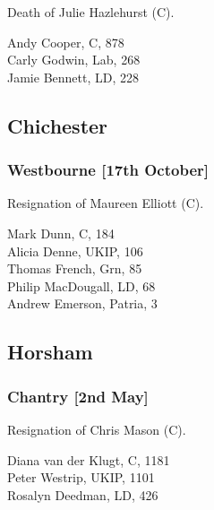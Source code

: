 \documentclass[a4paper,openany,10pt]{book}
\begin{document}

Death of Julie Hazlehurst (C).



Andy Cooper, C, 878\\
Carly Godwin, Lab, 268\\
Jamie Bennett, LD, 228\\


\subsection*{Chichester}

\subsubsection*{Westbourne \hspace*{\fill}\nolinebreak[1]%
\enspace\hspace*{\fill}
[17th October]}


Resignation of Maureen Elliott (C).



Mark Dunn, C, 184\\
Alicia Denne, UKIP, 106\\
Thomas French, Grn, 85\\
Philip MacDougall, LD, 68\\
Andrew Emerson, Patria, 3\\


\subsection*{Horsham}

\subsubsection*{Chantry \hspace*{\fill}\nolinebreak[1]%
\enspace\hspace*{\fill}
[2nd May]}


Resignation of Chris Mason (C).



Diana van der Klugt, C, 1181\\
Peter Westrip, UKIP, 1101\\
Rosalyn Deedman, LD, 426\\
\end{document}

